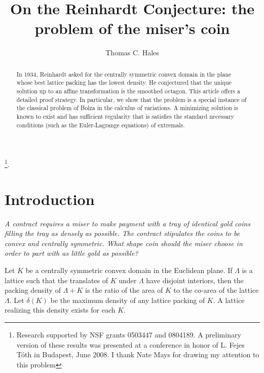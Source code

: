 \documentclass[11pt]{amsart}
\def\deltalat{\mathbb\delta}  %
\begin{document}
\title{On the Reinhardt Conjecture: the problem of the miser's coin}
\author{Thomas C. Hales}
\thanks{Research supported by NSF grants 0503447 and 0804189.  A preliminary version of these results was presented at a conference in honor of L. Fejes T\'oth in Budapest, June 2008.  I thank Nate Mays for drawing my attention to this problem}.


\begin{abstract}  
In 1934, Reinhardt asked for the centrally symmetric convex domain in the plane whose best lattice packing has the lowest density.  He conjectured that the unique solution up to an affine transformation is the smoothed octagon.  This article offers a detailed proof strategy.  In particular, we show that the problem
is a special instance of the classical problem of Bolza in the calculus
of variations.  A minimizing solution is known to exist and has sufficient regularity that is satisfies the standard necessary conditions (such as the Euler-Lagrange equations) of extremals.
\end{abstract}

\maketitle







\section{Introduction}

{\narrower\it A contract requires a miser to make payment with a tray of identical gold coins filling the tray as densely as possible.  The contract stipulates the coins to be convex and centrally symmetric.  What shape coin should the miser choose in order to part with as little gold as possible?}

Let $K$ be a centrally symmetric convex domain in the Euclidean plane.  
If $\Lambda$ is a lattice such that the translates of $K$ under $\Lambda$ have disjoint interiors, then the packing density of $\Lambda+K$ is the ratio of the area of $K$ to the co-area of the lattice $\Lambda$. 
Let $\deltalat(K)$ be the maximum density of any lattice packing of $K$.  A lattice realizing this density exists for each $K$.
\end{document}
